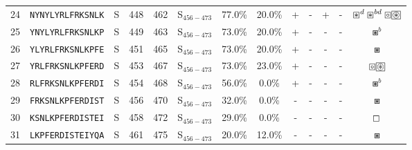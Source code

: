 \begin{tabular}{rcccccccccccc}
24 &  \texttt{NYNYLYRLFRKSNLK} &       S &    448 &   462 &  S$_{456-473}$ &                          77.0\% &                           20.0\% &          + &           - &          + &           - &  $ \boxast^d \boxast^{bd} \boxcircle \setlength{\fboxsep}{0.5pt} \boxed{\circledast} $ \\
25 &  \texttt{YNYLYRLFRKSNLKP} &       S &    449 &   463 &  S$_{456-473}$ &                          73.0\% &                           20.0\% &          + &           - &          - &           - &                                                                          $ \boxast^b $ \\
26 &  \texttt{YLYRLFRKSNLKPFE} &       S &    451 &   465 &  S$_{456-473}$ &                          73.0\% &                           20.0\% &          + &           - &          - &           - &                                                                            $ \boxast $ \\
27 &  \texttt{YRLFRKSNLKPFERD} &       S &    453 &   467 &  S$_{456-473}$ &                          73.0\% &                           23.0\% &          + &           - &          - &           - &                         $ \boxcircle \setlength{\fboxsep}{0.5pt} \boxed{\circledast} $ \\
28 &  \texttt{RLFRKSNLKPFERDI} &       S &    454 &   468 &  S$_{456-473}$ &                          56.0\% &                            0.0\% &          + &           - &          - &           - &                                                                          $ \boxast^b $ \\
29 &  \texttt{FRKSNLKPFERDIST} &       S &    456 &   470 &  S$_{456-473}$ &                          32.0\% &                            0.0\% &          - &           - &          - &           - &                                                                            $ \boxast $ \\
30 &  \texttt{KSNLKPFERDISTEI} &       S &    458 &   472 &  S$_{456-473}$ &                          29.0\% &                            0.0\% &          - &           - &          - &           - &                                                                          $ \boxempty $ \\
31 &  \texttt{LKPFERDISTEIYQA} &       S &    461 &   475 &  S$_{456-473}$ &                          20.0\% &                           12.0\% &          - &           - &          - &           - &                                                                            $ \boxast $ \\

\end{tabular}

